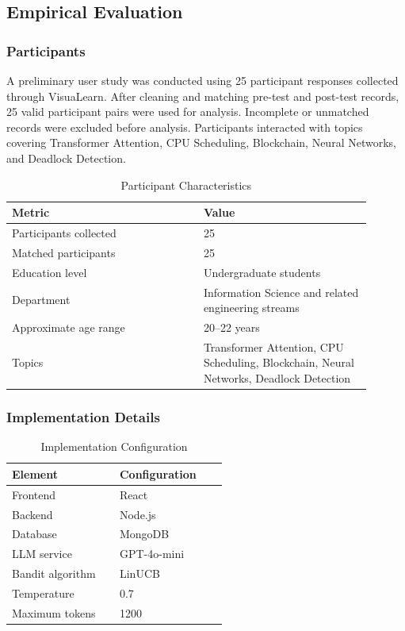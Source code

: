 \documentclass[conference]{IEEEtran}
\begin{document}
\subsection{Empirical Evaluation}

\subsubsection{Participants}

A preliminary user study was conducted using 25 participant responses collected through VisuaLearn. After cleaning and matching pre-test and post-test records, 25 valid participant pairs were used for analysis. Incomplete or unmatched records were excluded before analysis. Participants interacted with topics covering Transformer Attention, CPU Scheduling, Blockchain, Neural Networks, and Deadlock Detection.

\begin{table}[htbp]
\caption{Participant Characteristics}
\label{tab:participant-summary}
\centering
\begin{tabular}{p{0.48\linewidth}p{0.42\linewidth}}
\toprule
\textbf{Metric} & \textbf{Value} \\
\midrule
Participants collected & 25 \\
Matched participants & 25 \\
Education level & Undergraduate students \\
Department & Information Science and related engineering streams \\
Approximate age range & 20--22 years \\
Topics & Transformer Attention, CPU Scheduling, Blockchain, Neural Networks, Deadlock Detection \\
\bottomrule
\end{tabular}
\end{table}

\subsubsection{Implementation Details}

\begin{table}[htbp]
\caption{Implementation Configuration}
\label{tab:implementation}
\centering
\begin{tabular}{p{0.44\linewidth}p{0.44\linewidth}}
\toprule
\textbf{Element} & \textbf{Configuration} \\
\midrule
Frontend & React \\
Backend & Node.js \\
Database & MongoDB \\
LLM service & GPT-4o-mini \\
Bandit algorithm & LinUCB \\
Temperature & 0.7 \\
Maximum tokens & 1200 \\
\bottomrule
\end{tabular}
\end{table}
\end{document}
